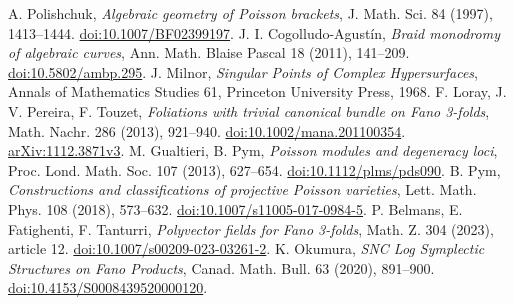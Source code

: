  A. Polishchuk, \emph{Algebraic geometry of Poisson brackets}, J. Math. Sci. 84 (1997), 1413--1444. \href{https://doi.org/10.1007/BF02399197}{doi:10.1007/BF02399197}.
 J. I. Cogolludo-Agustín, \emph{Braid monodromy of algebraic curves}, Ann. Math. Blaise Pascal 18 (2011), 141--209. \href{https://doi.org/10.5802/ambp.295}{doi:10.5802/ambp.295}.
 J. Milnor, \emph{Singular Points of Complex Hypersurfaces}, Annals of Mathematics Studies 61, Princeton University Press, 1968.
 F. Loray, J. V. Pereira, F. Touzet, \emph{Foliations with trivial canonical bundle on Fano 3-folds}, Math. Nachr. 286 (2013), 921--940. \href{https://doi.org/10.1002/mana.201100354}{doi:10.1002/mana.201100354}. \href{https://arxiv.org/abs/1112.3871v3}{arXiv:1112.3871v3}.
 M. Gualtieri, B. Pym, \emph{Poisson modules and degeneracy loci}, Proc. Lond. Math. Soc. 107 (2013), 627--654. \href{https://doi.org/10.1112/plms/pds090}{doi:10.1112/plms/pds090}.
 B. Pym, \emph{Constructions and classifications of projective Poisson varieties}, Lett. Math. Phys. 108 (2018), 573--632. \href{https://doi.org/10.1007/s11005-017-0984-5}{doi:10.1007/s11005-017-0984-5}.
 P. Belmans, E. Fatighenti, F. Tanturri, \emph{Polyvector fields for Fano 3-folds}, Math. Z. 304 (2023), article 12. \href{https://doi.org/10.1007/s00209-023-03261-2}{doi:10.1007/s00209-023-03261-2}.
 K. Okumura, \emph{SNC Log Symplectic Structures on Fano Products}, Canad. Math. Bull. 63 (2020), 891--900. \href{https://doi.org/10.4153/S0008439520000120}{doi:10.4153/S0008439520000120}.
